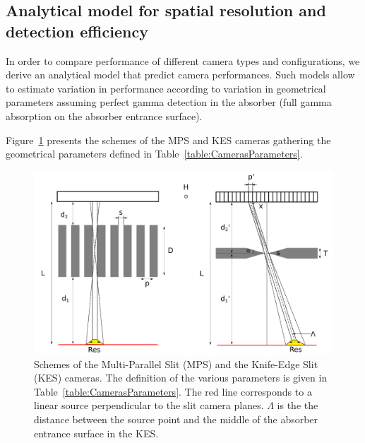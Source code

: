 \documentclass[a4paper,english,12pt]{article}
\begin{document}
\subsection{Analytical model for spatial resolution and detection efficiency}


In order to compare performance of different camera types and configurations, we derive an analytical model that predict camera performances. Such models allow to estimate variation in performance according to variation in geometrical parameters assuming perfect gamma detection in the absorber (full gamma absorption on the absorber entrance surface).

Figure~\ref{fig:CamerasParameters} presents the schemes of the MPS and KES cameras gathering the geometrical parameters defined in Table~\ref{table:CamerasParameters}.

\begin{figure}[htbp]
    \centering
    \includegraphics[width=.8\textwidth]{MPS-KES_scheme}
    \caption{Schemes of the Multi-Parallel Slit (MPS) and the Knife-Edge Slit (KES) cameras. The definition of the various parameters is given in Table~\ref{table:CamerasParameters}. The red line corresponds to a linear source perpendicular to the slit camera planes. $\Lambda$ is the the distance between the source point and the middle of the absorber entrance surface in the KES.}
    \label{fig:CamerasParameters}
\end{figure}    
\end{document}

